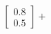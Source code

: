 \documentclass[preview]{standalone}
\begin{document}
\begin{align*}
\begin{bmatrix} 0.8 \\ 0.5 \end{bmatrix} +
\end{align*}
\end{document}
